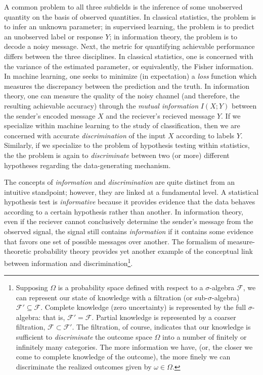 A common problem to all three subfields is the inference of some
unobserved quantity on the basis of observed quantities.  In classical
statistics, the problem is to infer an unknown parameter; in
supervised learning, the problem is to predict an unobserved label or
response $Y$; in information theory, the problem is to decode a noisy
message.  Next, the metric for quantifying achievable performance
differs between the three disciplines.  In classical statistics, one
is concerned with the variance of the estimated parameter, or
equivalently, the Fisher information.  In machine learning, one seeks
to minimize (in expectation) a \emph{loss} function which measures the
discrepancy between the prediction and the truth.  In information
theory, one can measure the quality of the noisy channel (and
therefore, the resulting achievable accuracy) through the \emph{mutual
  information} $I(X; Y)$ between the sender's encoded message $X$ and
the reciever's recieved message $Y$.  If we specialize within machine
learning to the study of classification, then we are concerned with
accurate \emph{discrimination} of the input $X$ according to labels
$Y$.  Similarly, if we specialize to the problem of hypothesis testing
within statistics, the the problem is again to \emph{discriminate}
between two (or more) different hypotheses regarding the
data-generating mechanism.

The concepts of \emph{information} and \emph{discrimination} are quite
distinct from an intuitive standpoint; however, they are linked at a
fundamental level.  
A statistical hypothesis test is \emph{informative} because it
provides evidence that the data behaves according to a certain
hypothesis rather than another.  %
In information theory, even if the reciever cannot conclusively
determine the sender's message from the observed signal, the signal
still contains \emph{information} if it contains some evidence that
favors one set of possible messages over another.  The formalism of
measure-theoretic probability theory provides yet another example of
the conceptual link between information and
discrimination\footnote{Supposing $\Omega$ is a probability space
  defined with respect to a $\sigma$-algebra $\mathcal{F}$, we can
  represent our state of knowledge with a filtration (or
  sub-$\sigma$-algebra) $\mathcal{F}' \subseteq \mathcal{F}$.
  Complete knowledge (zero uncertainty) is represented by the full
  $\sigma$-algebra: that is, $\mathcal{F}' = \mathcal{F}$.  Partial
  knowledge is represented by a coarser filtration, $\mathcal{F}
  \subset \mathcal{F}'$.  The filtration, of course, indicates that
  our knowledge is sufficient to \emph{discriminate} the outcome space
  $\Omega$ into a number of finitely or infinitely many categories.
  The more information we have, (or, the closer we come to complete
  knowledge of the outcome), the more finely we can discriminate the
  realized outcomes given by $\omega \in \Omega$.}.

